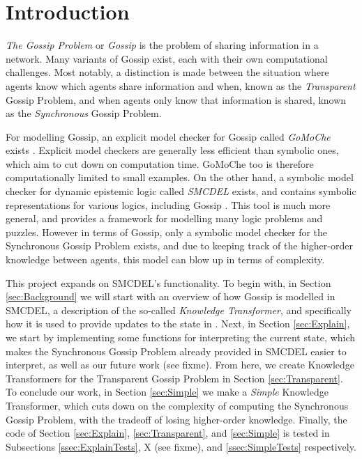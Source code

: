 \section{Introduction}

\textit{The Gossip Problem} or \textit{Gossip} is the problem of sharing information in a network. Many variants of Gossip exist, each with their own computational challenges. Most notably, a distinction is made between the situation where agents know which agents share information and when, known as the \textit{Transparent} Gossip Problem, and when agents only know that information is shared, known as the \textit{Synchronous} Gossip Problem.

For modelling Gossip, an explicit model checker for Gossip called \textit{GoMoChe} exists \cite{gattinger2023gomoche}. Explicit model checkers are generally less efficient than symbolic ones, which aim to cut down on computation time. GoMoChe too is therefore computationally limited to small examples. On the other hand, a symbolic model checker for dynamic epistemic logic called \textit{SMCDEL} exists, and contains symbolic representations for various logics, including Gossip \cite{GattingerThesis2018}. This tool is much more general, and provides a framework for modelling many logic problems and puzzles. However in terms of Gossip, only a symbolic model checker for the Synchronous Gossip Problem exists, and due to keeping track of the higher-order knowledge between agents, this model can blow up in terms of complexity.

This project expands on SMCDEL's functionality. To begin with, in Section \ref{sec:Background} we will start with an overview of how Gossip is modelled in SMCDEL, a description of the so-called \textit{Knowledge Transformer}, and specifically how it is used to provide updates to the state in \cite{GattingerThesis2018}. Next, in Section \ref{sec:Explain}, we start by implementing some functions for interpreting the current state, which makes the Synchronous Gossip Problem already provided in SMCDEL easier to interpret, as well as our future work (see fixme). From here, we create Knowledge Transformers for the Transparent Gossip Problem in Section \ref{sec:Transparent}. To conclude our work, in Section \ref{sec:Simple} we make a \textit{Simple} Knowledge Transformer, which cuts down on the complexity of computing the Synchronous Gossip Problem, with the tradeoff of losing higher-order knowledge. Finally, the code of Section \ref{sec:Explain}, \ref{sec:Transparent}, and \ref{sec:Simple} is tested in Subsections \ref{ssec:ExplainTests}, X (see fixme), and \ref{ssec:SimpleTests} respectively.


